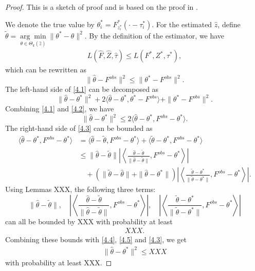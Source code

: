 \begin{proof}
This is a sketch of proof and is based on the proof in \cite{Gao2015a}.

We denote the true value by $\theta^*_i = F^*_{z_i^*}(\cdot - \tau_i^*)$. 
For the estimated $\hat z$, define $ \tilde \theta = \underset{\theta\in\Theta_k(\hat z)}{\arg\min} \| \theta^* - \theta\|^2 $.
By the definition of the estimator, we  have
\begin{align*}
L(\hat F, \hat Z, \hat \tau) \leq L(F^*, Z^*, \tau^*),
\end{align*}
which can be rewritten as
\begin{equation}\label{4.1}
\| \hat \theta - F^{obs}\|^2 \leq \|\theta^* - F^{obs}\|^2.
\end{equation}
The left-hand side of \eqref{4.1} can be decomposed as
\begin{equation}\label{4.2}
\| \hat \theta - \theta^*\|^2 + 2\langle \hat \theta - \theta^*, \theta^* - F^{obs} \rangle + \| \theta^* - F^{obs}\|^2.
\end{equation}
Combining \eqref{4.1} and \eqref{4.2}, we have
\begin{equation}\label{4.3}
\| \hat \theta - \theta ^* \|^2 \leq 2 \langle \hat \theta - \theta^*, F^{obs}-\theta^* \rangle.
\end{equation}
The right-hand side of \eqref{4.3} can be bounded as 
\begin{align}
\nonumber
\langle \hat \theta - \theta^*, F^{obs} - \theta^*\rangle 
&= 
\langle \hat \theta - \tilde\theta, F^{obs} - \theta^*\rangle 
+ \langle \tilde \theta - \theta^*, F^{obs} - \theta^*\rangle \\
\label{4.4}
&\leq 
\| \hat \theta - \tilde \theta \|  
\left| \left\langle \frac{\hat \theta - \tilde \theta}{\| \hat \theta - \tilde \theta \|}, F^{obs} - \theta^* \right\rangle \right|\\
\label{4.5}
& \quad + 
\left( \| \tilde \theta - \hat \theta \| +  \| \hat \theta -  \theta^* \| \right) 
\left| \left\langle \frac{\tilde \theta -  \theta^*}{\| \tilde \theta - \theta^* \|}, F^{obs} - \theta^* \right\rangle \right|.
\end{align}
Using Lemmas XXX, the following three terms:
\begin{equation}\label{4.6}
\| \hat \theta - \tilde \theta \| , 
\quad 
\left| \left\langle \frac{\hat \theta - \tilde \theta}{\| \hat \theta - \tilde \theta \|}, F^{obs} - \theta^* \right\rangle \right|,
\quad
\left| \left\langle \frac{\tilde \theta -  \theta^*}{\| \tilde \theta - \theta^* \|}, F^{obs} - \theta^* \right\rangle \right|
\end{equation}
can all be bounded by XXX with probability at least
\begin{align*}
XXX.
\end{align*}
Combining these bounds with \eqref{4.4}, \eqref{4.5}
and \eqref{4.3}, we get
\begin{align*}
\|\hat \theta - \theta^* \|^2 \leq XXX
\end{align*}
with probability at least XXX. 
\end{proof}

